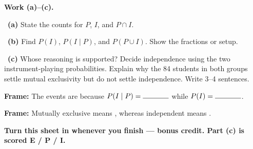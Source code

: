 \documentclass[11pt]{article}
\begin{document}
\newpage
\textbf{Work (a)--(c).}\par\smallskip

~\textbf{(a)} State the counts for $P$, $I$, and $P\cap I$.\par
\workspace{0.7in}

~\textbf{(b)} Find $P(I)$, $P(I\mid P)$, and $P(P\cup I)$. Show the fractions or setup.\par
\workspace{1.4in}

~\textbf{(c)} Whose reasoning is supported? Decide independence using the two instrument-playing probabilities. Explain why the 84 students in both groups settle mutual exclusivity but do not settle independence. Write 3--4 sentences.\par
\workspace{2.0in}

\begin{sentenceframebox}\raggedright\textbf{Frame:} The events are \blank[0.9in] because $P(I\mid P)=\blank[0.5in]$ while $P(I)=\blank[0.5in]$.\end{sentenceframebox}

\begin{sentenceframebox}\raggedright\textbf{Frame:} Mutually exclusive means \blank[1.8in], whereas independent means \blank[2.0in].\end{sentenceframebox}

\textbf{Turn this sheet in whenever you finish --- bonus credit. Part (c) is scored E / P / I.}\par
\end{document}
